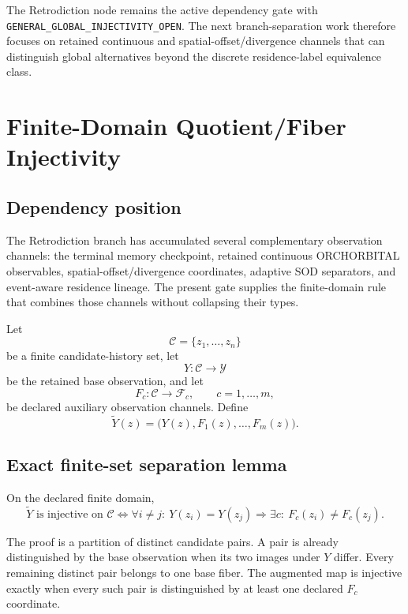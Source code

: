 The Retrodiction node remains the active dependency gate with \texttt{GENERAL\_GLOBAL\_INJECTIVITY\_OPEN}. The next branch-separation work therefore focuses on retained continuous and spatial-offset/divergence channels that can distinguish global alternatives beyond the discrete residence-label equivalence class.


\chapter{Finite-Domain Quotient/Fiber Injectivity}
\label{chap:quotient-fiber-finite-injectivity}

\section{Dependency position}

The Retrodiction branch has accumulated several complementary observation channels: the terminal memory checkpoint, retained continuous ORCHORBITAL observables, spatial-offset/divergence coordinates, adaptive SOD separators, and event-aware residence lineage.  The present gate supplies the finite-domain rule that combines those channels without collapsing their types.

Let
\[
\mathcal C=\{z_1,\ldots,z_n\}
\]
be a finite candidate-history set, let
\[
Y:\mathcal C\to\mathcal Y
\]
be the retained base observation, and let
\[
F_c:\mathcal C\to\mathcal F_c,
\qquad c=1,\ldots,m,
\]
be declared auxiliary observation channels.  Define
\[
\widetilde Y(z)
=\bigl(Y(z),F_1(z),\ldots,F_m(z)\bigr).
\]

\section{Exact finite-set separation lemma}

On the declared finite domain,
\[
\boxed{
\widetilde Y\text{ is injective on }\mathcal C
\iff
\forall i\ne j:\
Y(z_i)=Y(z_j)
\Longrightarrow
\exists c:\ F_c(z_i)\ne F_c(z_j).
}
\]

The proof is a partition of distinct candidate pairs.  A pair is already distinguished by the base observation when its two images under $Y$ differ.  Every remaining distinct pair belongs to one base fiber.  The augmented map is injective exactly when every such pair is distinguished by at least one declared $F_c$ coordinate.


